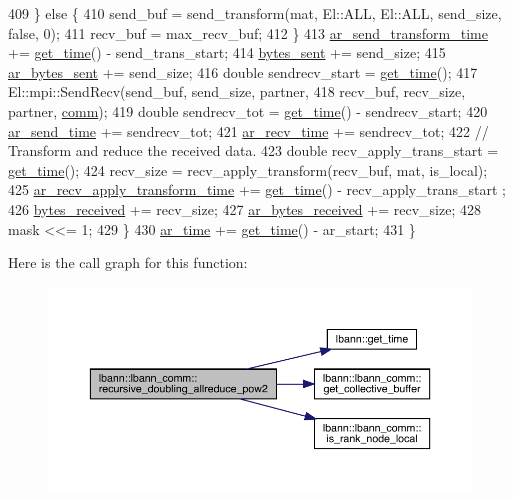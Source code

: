 \begin{DoxyCode}
409     \} \textcolor{keywordflow}{else} \{
410       send\_buf = send\_transform(mat, El::ALL, El::ALL, send\_size, \textcolor{keyword}{false}, 0);
411       recv\_buf = max\_recv\_buf;
412     \}
413     \hyperlink{classlbann_1_1lbann__comm_a4e3d35520a8f567579f9235e9808ba1c}{ar\_send\_transform\_time} += \hyperlink{namespacelbann_a478d36031ff0659893c4322cd856157f}{get\_time}() - send\_trans\_start;
414     \hyperlink{classlbann_1_1lbann__comm_ad1f146ae7337ece6266fd307944928e0}{bytes\_sent} += send\_size;
415     \hyperlink{classlbann_1_1lbann__comm_aa520c16eafde742b70daf60866afc6a8}{ar\_bytes\_sent} += send\_size;
416     \textcolor{keywordtype}{double} sendrecv\_start = \hyperlink{namespacelbann_a478d36031ff0659893c4322cd856157f}{get\_time}();
417     El::mpi::SendRecv(send\_buf, send\_size, partner,
418                       recv\_buf, recv\_size, partner, \hyperlink{file__io_8cpp_ab048c6f9fcbcfaa57ce68b00263dbebe}{comm});
419     \textcolor{keywordtype}{double} sendrecv\_tot = \hyperlink{namespacelbann_a478d36031ff0659893c4322cd856157f}{get\_time}() - sendrecv\_start;
420     \hyperlink{classlbann_1_1lbann__comm_a60a664f47efb52d9936b72d34059d1ef}{ar\_send\_time} += sendrecv\_tot;
421     \hyperlink{classlbann_1_1lbann__comm_a4c9323938961c3524dc67f4b7b47e3ae}{ar\_recv\_time} += sendrecv\_tot;
422     \textcolor{comment}{// Transform and reduce the received data.}
423     \textcolor{keywordtype}{double} recv\_apply\_trans\_start = \hyperlink{namespacelbann_a478d36031ff0659893c4322cd856157f}{get\_time}();
424     recv\_size = recv\_apply\_transform(recv\_buf, mat, is\_local);
425     \hyperlink{classlbann_1_1lbann__comm_aa642b0ae2321fa464b0092da527f6375}{ar\_recv\_apply\_transform\_time} += \hyperlink{namespacelbann_a478d36031ff0659893c4322cd856157f}{get\_time}() - recv\_apply\_trans\_start
      ;
426     \hyperlink{classlbann_1_1lbann__comm_afb99f57f7eafc0695bf28e6c26a8120f}{bytes\_received} += recv\_size;
427     \hyperlink{classlbann_1_1lbann__comm_aa5f3c53358bf9002b9fab41918b0c8c1}{ar\_bytes\_received} += recv\_size;
428     mask <<= 1;
429   \}
430   \hyperlink{classlbann_1_1lbann__comm_aa57d2fbeef85fd8a3c9f2a37ca7687c8}{ar\_time} += \hyperlink{namespacelbann_a478d36031ff0659893c4322cd856157f}{get\_time}() - ar\_start;
431 \}
\end{DoxyCode}
Here is the call graph for this function\+:\nopagebreak
\begin{figure}[H]
\begin{center}
\leavevmode
\includegraphics[width=350pt]{classlbann_1_1lbann__comm_a99bc2f8128f0b0e2ebdf876a3a343635_cgraph}
\end{center}
\end{figure}
